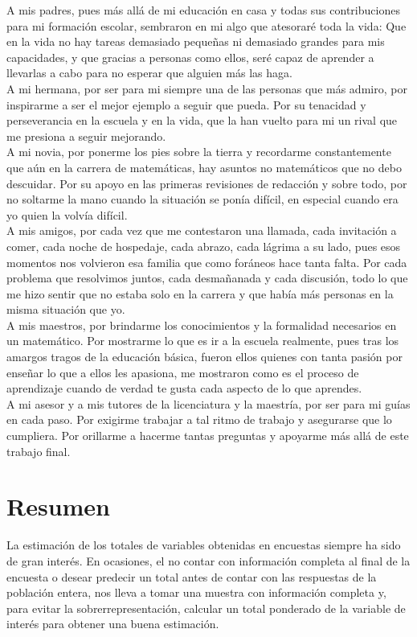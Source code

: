 \documentclass[a4paper,twoside,openright,12pt]{book}
\theoremstyle{definition}
\numberwithin{equation}{chapter}
\numberwithin{figure}{chapter}
\numberwithin{table}{chapter}
\numberwithin{theorem}{chapter}
\numberwithin{lemma}{chapter}
\begin{document}
A mis padres, pues más allá de mi educación en casa y todas sus contribuciones para mi formación escolar, sembraron en mi algo que atesoraré toda la vida: Que en la vida no hay tareas demasiado pequeñas ni demasiado grandes para mis capacidades, y que gracias a personas como ellos, seré capaz de aprender a llevarlas a cabo para no esperar que alguien más las haga.\\

A mi hermana, por ser para mi siempre una de las personas que más admiro, por inspirarme a ser el mejor ejemplo a seguir que pueda. Por su tenacidad y perseverancia en la escuela y en la vida, que la han vuelto para mi un rival que me presiona a seguir mejorando.\\

A mi novia, por ponerme los pies sobre la tierra y recordarme constantemente que aún en la carrera de matemáticas, hay asuntos no matemáticos que no debo descuidar. Por su apoyo en las primeras revisiones de redacción y sobre todo, por no soltarme la mano cuando la situación se ponía difícil, en especial cuando era yo quien la volvía difícil.\\

A mis amigos, %
por cada vez que me contestaron una llamada, cada invitación a comer, cada noche de hospedaje, cada abrazo, cada lágrima a su lado, pues esos momentos nos volvieron esa familia que como foráneos hace tanta falta. Por cada problema que resolvimos juntos, cada desmañanada y cada discusión, todo lo que me hizo sentir que no estaba solo en la carrera y que había más personas en la misma situación que yo.\\

A mis maestros, por brindarme los conocimientos y la formalidad necesarios en un matemático. Por mostrarme lo que es ir a la escuela realmente, pues tras los amargos tragos de la educación básica, fueron ellos quienes con tanta pasión por enseñar lo que a ellos les apasiona, me mostraron como es el proceso de aprendizaje cuando de verdad te gusta cada aspecto de lo que aprendes.\\

A mi asesor y a mis tutores de la licenciatura y la maestría, por ser para mi guías en cada paso. Por exigirme trabajar a tal ritmo de trabajo y asegurarse que lo cumpliera. Por orillarme a hacerme tantas preguntas y apoyarme más allá de este trabajo final.
\chapter*{Resumen}
\thispagestyle{style2}
La estimación de los totales de variables obtenidas en encuestas siempre ha sido de gran interés. En ocasiones, el no contar con información completa al final de la encuesta o desear predecir un total antes de contar con las respuestas de la población entera, nos lleva a tomar una muestra con información completa y, para evitar la sobrerrepresentación, calcular un total ponderado de la variable de interés para obtener una buena estimación.
\end{document}
